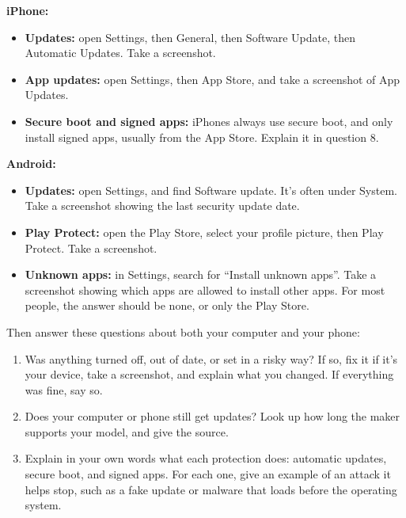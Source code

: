 \documentclass[12pt]{article}
\begin{document}
\textbf{iPhone:}
\begin{itemize}
    \item \textbf{Updates:} open Settings, then General, then Software Update, then Automatic Updates. Take a screenshot.
    \item \textbf{App updates:} open Settings, then App Store, and take a screenshot of App Updates.
    \item \textbf{Secure boot and signed apps:} iPhones always use secure boot, and only install signed apps, usually from the App Store. Explain it in question 8.
\end{itemize}
\textbf{Android:}
\begin{itemize}
    \item \textbf{Updates:} open Settings, and find Software update. It's often under System. Take a screenshot showing the last security update date.
    \item \textbf{Play Protect:} open the Play Store, select your profile picture, then Play Protect. Take a screenshot.
    \item \textbf{Unknown apps:} in Settings, search for ``Install unknown apps''. Take a screenshot showing which apps are allowed to install other apps. For most people, the answer should be none, or only the Play Store.
\end{itemize}

Then answer these questions about both your computer and your phone:
\begin{enumerate}[start=6]
    \item Was anything turned off, out of date, or set in a risky way? If so, fix it if it's your device, take a screenshot, and explain what you changed. If everything was fine, say so.
    \item Does your computer or phone still get updates? Look up how long the maker supports your model, and give the source.
    \item Explain in your own words what each protection does: automatic updates, secure boot, and signed apps. For each one, give an example of an attack it helps stop, such as a fake update or malware that loads before the operating system.
\end{enumerate}
\end{document}
